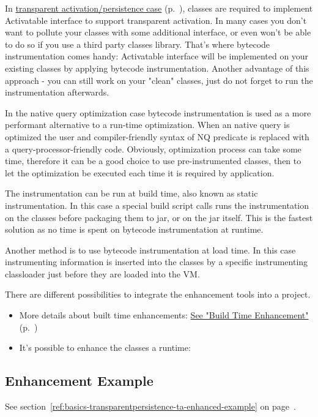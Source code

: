 In \hyperref[ref:basics-update-concept-transparent-persistence]{transparent activation/persistence case} (p.~\pageref{ref:basics-update-concept-transparent-persistence}), classes are required to implement Activatable interface to support transparent activation. In many cases you don't want to pollute your classes with some additional interface, or even won't be able to do so if you use a third party classes library. That's where bytecode instrumentation comes handy: Activatable interface will be implemented on your existing classes by applying bytecode instrumentation. Another advantage of this approach - you can still work on your "clean" classes, just do not forget to run the instrumentation afterwards.

In the native query optimization case bytecode instrumentation is used as a more performant alternative to a run-time optimization. When an native query is optimized the user and compiler-friendly syntax of NQ predicate is replaced with a query-processor-friendly code. Obviously, optimization process can take some time, therefore it can be a good choice to use pre-instrumented classes, then to let the optimization be executed each time it is required by application.

The instrumentation can be run at build time, also known as static instrumentation. In this case a special build script calls runs the instrumentation on the classes before packaging them to jar, or on the jar itself. This is the fastest solution as no time is spent on bytecode instrumentation at runtime.

Another method is to use bytecode instrumentation at load time. In this case instrumenting information is inserted into the classes by a specific instrumenting classloader just before they are loaded into the VM.

There are different possibilities to integrate the enhancement tools into a project.

\begin{itemize}
\item More details about built time enhancements: \hyperref[ref:advanced-topics-enhancement-tools-enhancement-for-java-build-time-enhancement]{See "Build Time Enhancement"} (p.~\pageref{ref:advanced-topics-enhancement-tools-enhancement-for-java-build-time-enhancement})
\item It's possible to enhance the classes a runtime:
\end{itemize}

\subsection{Enhancement Example}
See section~\ref{ref:basics-transparentpersistence-ta-enhanced-example} on page~\pageref{ref:basics-transparentpersistence-ta-enhanced-example}.

